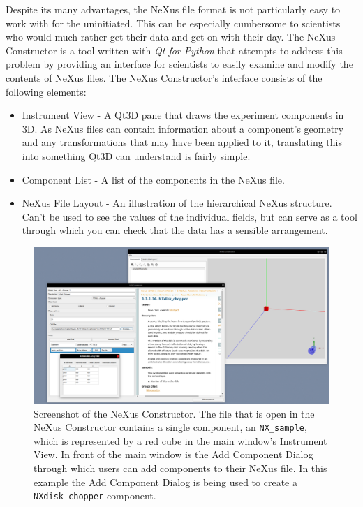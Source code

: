 Despite its many advantages, the NeXus file format is not particularly easy to work with for the uninitiated. This can be especially cumbersome to scientists who would much rather get their data and get on with their day. The NeXus Constructor is a tool written with \textit{Qt for Python} that attempts to address this problem by providing an interface for scientists to easily examine and modify the contents of NeXus files. The NeXus Constructor's interface consists of the following elements:


\begin{itemize}
\item Instrument View - A Qt3D pane that draws the experiment components in 3D. As NeXus files can contain information about a component's geometry and any transformations that may have been applied to it, translating this into something Qt3D can understand is fairly simple.
\item Component List - A list of the components in the NeXus file.
\item NeXus File Layout - An illustration of the hierarchical NeXus structure. Can't be used to see the values of the individual fields, but can serve as a tool through which you can check that the data has a sensible arrangement.
\end{itemize}

\begin{figure}
\includegraphics[width=\linewidth]{screenshot.png}
\caption{Screenshot of the NeXus Constructor. The file that is open in the NeXus Constructor contains a single component, an \texttt{NX\_sample}, which is represented by a red cube in the main window's Instrument View. In front of the main window is the Add Component Dialog through which users can add components to their NeXus file. In this example the Add Component Dialog is being used to create a \texttt{NXdisk\_chopper} component.}
\end{figure}
